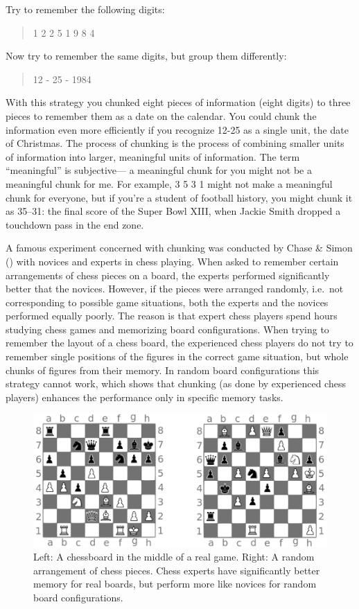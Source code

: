 \documentclass[
]{krantz}
\begin{document}
Try to remember the following digits:

\begin{quote}
1 2 2 5 1 9 8 4
\end{quote}

Now try to remember the same digits, but group them differently:

\begin{quote}
12 - 25 - 1984
\end{quote}

With this strategy you chunked eight pieces of information (eight digits) to three pieces to remember them as a date on the calendar. You could chunk the information even more efficiently if you recognize 12-25 as a single unit, the date of Christmas. The process of chunking is the process of combining smaller units of information into larger, meaningful units of information. The term ``meaningful'' is subjective--- a meaningful chunk for you might not be a meaningful chunk for me. For example, 3 5 3 1 might not make a meaningful chunk for everyone, but if you're a student of football history, you might chunk it as 35--31: the final score of the Super Bowl XIII, when Jackie Smith dropped a touchdown pass in the end zone.

A famous experiment concerned with chunking was conducted by Chase \& Simon () with novices and experts in chess playing. When asked to remember certain arrangements of chess pieces on a board, the experts performed significantly better that the novices. However, if the pieces were arranged randomly, i.e.~not corresponding to possible game situations, both the experts and the novices performed equally poorly. The reason is that expert chess players spend hours studying chess games and memorizing board configurations. When trying to remember the layout of a chess board, the experienced chess players do not try to remember single positions of the figures in the correct game situation, but whole chunks of figures from their memory. In random board configurations this strategy cannot work, which shows that chunking (as done by experienced chess players) enhances the performance only in specific memory tasks.

\begin{figure}

{\centering \includegraphics[width=0.8\linewidth]{images/ch4/chess} 

}

\caption{Left: A chessboard in the middle of a real game. Right: A random arrangement of chess pieces. Chess experts have significantly better memory for real boards, but perform more like novices for random board configurations.}\label{fig:chess}
\end{figure}
\end{document}
